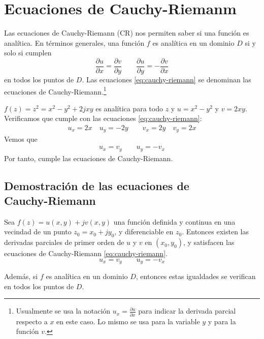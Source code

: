 \section{Ecuaciones de Cauchy-Riemanm}

Las ecuaciones de Cauchy-Riemann (CR) nos permiten saber si una función es analítica. En términos generales, una función $f$ es analítica en un dominio $D$ si y solo si cumplen
\begin{equation}
  \frac{\partial u}{\partial x} = \frac{\partial v}{\partial y} \qquad \frac{\partial u}{\partial y} = -\frac{\partial v}{\partial x}
  \label{eq:cauchy-riemann}
\end{equation}
en todos los puntos de $D$. Las ecuaciones \ref{eq:cauchy-riemann} se denominan las ecuaciones de Cauchy-Riemann.\footnote{Usualmente se usa la notación $u_x=\frac{\partial u}{\partial x}$ para indicar la derivada parcial respecto a $x$ en este caso. Lo mismo se usa para la variable $y$ y para la función $v$.}

\begin{example}
  $f(z)=z^2=x^2-y^2+2jxy$ es analítica para todo $z$ y $u=x^2-y^2$ y $v=2xy$. Verificamos que cumple con las ecuaciones \ref{eq:cauchy-riemann}:
  \begin{gather*}
    u_x = 2x \quad u_y = -2y \qquad v_x = 2y \quad v_y = 2x
  \end{gather*}
  Vemos que
  \begin{align*}
    u_x = v_y \qquad u_y = -v_x
  \end{align*}
  Por tanto, cumple las ecuaciones de Cauchy-Riemann.
\end{example}

\subsection[Demostración de las ecuaciones de Cauchy-Riemann]{Demostración de las ecuaciones de\\Cauchy-Riemann}

\begin{theorem}\label{teo:ecuaciones_de_cr}
Sea $f(z) = u(x, y) + jv(x, y)$ una función definida y continua en una vecindad de un punto $z_0 = x_0 + jy_0$, y diferenciable en $z_0$.  
Entonces existen las derivadas parciales de primer orden de $u$ y $v$ en $(x_0, y_0)$, y satisfacen las ecuaciones de Cauchy-Riemann \ref{eq:cauchy-riemann}.
\begin{equation*}
  u_x=v_y \qquad u_y=-v_x
\end{equation*}

Además, si $f$ es analítica en un dominio $D$, entonces estas igualdades se verifican en todos los puntos de $D$.
\end{theorem}

